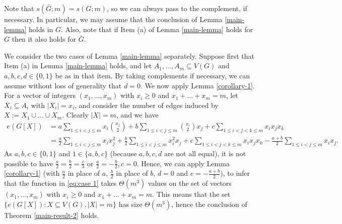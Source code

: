 \documentclass[11pt]{article}
\let\oldendproof\endproof
\renewenvironment{proof}[1][\proofname]{%
	\oldproof[\bf #1]%
}{\oldendproof}
\theoremstyle{plain}
\begin{document}
\begin{proof}[Proof of Theorem \ref{main-result-2}]
    Note that $s(\bar{G};m) = s(G;m)$, so we can always pass to the complement, if necessary. In particular, we may assume that the conclusion of Lemma \ref{main-lemma} holds in $G$. Also, note that if Item (a) of Lemma \ref{main-lemma} holds for $G$ then it also holds for $\bar{G}$.
    
    We consider the two cases of Lemma \ref{main-lemma} separately.
    Suppose first that Item (a) in Lemma \ref{main-lemma} holds, and let $A_1,\dots,A_m\subseteq V(G)$ and $a,b,c,d \in \{0,1\}$ be as in that item. By taking complements if necessary, we can assume without loss of generality that $d=0$. 
    We now apply Lemma \ref{corollary-1}. For a vector of integers $(x_1, \dots, x_m)$ with $x_i \geq 0$ and $x_1 + \dots + x_m = m$, let $X_i \subseteq A_i$ with $|X_i|=x_i$, and consider the number of edges induced by $X := X_1 \cup \dots \cup X_m$. Clearly $|X| = m$, and we have
	\begin{align}\label{eq:case 1}
    \nonumber e(G[X]) &= a \sum_{1 \leq i < j \leq m} x_i\binom{x_j}{2} + b \sum_{1 \leq i < j \leq m} \binom{x_i}{2} x_j + c \sum_{1 \leq i < j < k \leq m} x_i x_j x_k \\ &=
    \frac{a}{2} \sum_{1 \leq i < j \leq m} x_i x_j^2 + \frac{b}{2} \sum_{1 \leq i < j \leq m} x_i^2 x_j + c \sum_{1 \leq i < j < k \leq m} x_i x_j x_k - \frac{a+b}{2} \sum_{1 \leq i < j \leq m} x_i x_j.
	\end{align}
    As $a,b,c \in \{0,1\}$ and $1 \in \{a,b,c\}$ (because $a,b,c,d$ are not all equal), it is not possible to have 
    $\frac{a}{2} = \frac{b}{2} = \frac{c}{3}$ or 
    $\frac{a}{2}=-\frac{b}{2},c=0$. Hence, we can apply Lemma \ref{corollary-1} (with $\frac{a}{2}$ in place of $a$, $\frac{b}{2}$ in place of $b$, $d=0$ and $e = -\frac{a+b}{2}$), to infer that the function in \eqref{eq:case 1} takes $\Theta(m^3)$ values on the set of vectors $(x_1,\dots,x_m)$ with $x_i \geq 0$ and $x_1 + \dots + x_m = m$.
    This means that the set $\{e(G[X]) : X \subseteq V(G), |X| = m\}$ has size $\Theta(m^3)$, hence
    the conclusion of Theorem \ref{main-result-2} holds. 
    

\end{proof}
\end{document}
